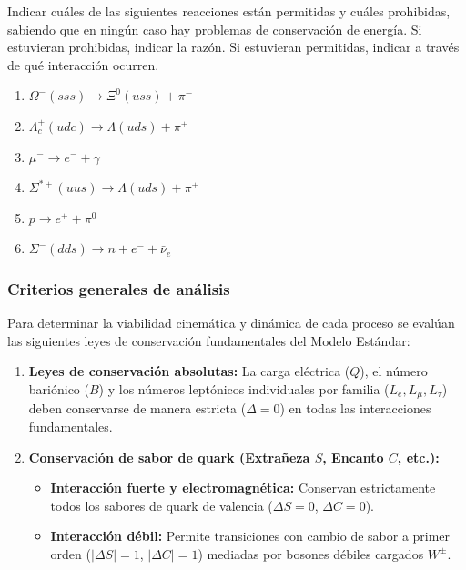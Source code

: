 \newpage
\begin{problema}
Indicar cuáles de las siguientes reacciones están permitidas y cuáles prohibidas, sabiendo que en ningún caso hay problemas de conservación de energía. Si estuvieran prohibidas, indicar la razón. Si estuvieran permitidas, indicar a través de qué interacción ocurren.

\begin{enumerate}[label=\alph*)]
    \item $\Omega^- (sss) \longrightarrow \Xi^0 (uss) + \pi^-$
    \item $\Lambda_c^+ (udc) \longrightarrow \Lambda (uds) + \pi^+$
    \item $\mu^- \longrightarrow e^- + \gamma$
    \item $\Sigma^{*+} (uus) \longrightarrow \Lambda (uds) + \pi^+$
    \item $p \longrightarrow e^+ + \pi^0$
    \item $\Sigma^- (dds) \longrightarrow n + e^- + \bar{\nu}_e$
\end{enumerate}

\tcblower

\subsubsection*{Criterios generales de análisis}

Para determinar la viabilidad cinemática y dinámica de cada proceso se evalúan las siguientes leyes de conservación fundamentales del Modelo Estándar:
\begin{enumerate}[label=\arabic*.]
    \item \textbf{Leyes de conservación absolutas:} La carga eléctrica ($Q$), el número bariónico ($B$) y los números leptónicos individuales por familia ($L_e, L_\mu, L_\tau$) deben conservarse de manera estricta ($\Delta = 0$) en todas las interacciones fundamentales.
    \item \textbf{Conservación de sabor de quark (Extrañeza $S$, Encanto $C$, etc.):}
    \begin{itemize}
        \item \textbf{Interacción fuerte y electromagnética:} Conservan estrictamente todos los sabores de quark de valencia ($\Delta S = 0$, $\Delta C = 0$).
        \item \textbf{Interacción débil:} Permite transiciones con cambio de sabor a primer orden ($|\Delta S| = 1$, $|\Delta C| = 1$) mediadas por bosones débiles cargados $W^\pm$.
    \end{itemize}
\end{enumerate}


\end{problema}
